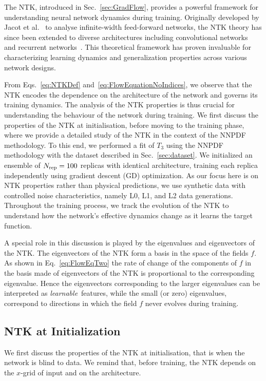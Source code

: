 The NTK, introduced in Sec.~\ref{sec:GradFlow}, provides a powerful framework for understanding neural
network dynamics during training. Originally developed by Jacot et
al.~\cite{jacot2018neural} to analyse infinite-width feed-forward networks, the
NTK theory has since been extended to diverse architectures including
convolutional networks~\cite{arora2019exact} and recurrent
networks~\cite{alemohammad2021recurrent}. This theoretical framework has proven
invaluable for characterizing learning dynamics and generalization properties
across various network designs.

From Eqs.~\eqref{eq:NTKDef} and~\eqref{eq:FlowEquationNoIndices}, we observe that the NTK encodes the
dependence on the architecture of the network and governs its training dynamics.
The analysis of the NTK properties is thus crucial for understanding the 
behaviour of the network during training. We first discuss the properties of the NTK at
initialisation, before moving to the training phase, where we provide a detailed
study of the NTK in the context of the NNPDF methodology. To this end, we
performed a fit of $T_3$ using the NNPDF methodology with the dataset described
in Sec.~\ref{sec:dataset}. We initialized an ensemble of $N_{\rm rep} = 100$ replicas with
identical architecture, training each replica independently using gradient
descent (GD) optimization. As our focus here is on NTK properties rather than
physical predictions, we use synthetic data with controlled noise
characteristics, namely L0, L1, and L2 data generations. Throughout the training process, 
we track the evolution of the NTK to understand how the network's effective
dynamics change as it learns the target function.

A special role in this discussion is played by the eigenvalues and eigenvectors of the NTK. 
The eigenvectors of the NTK form a basis in the space of the fields $f$. 
As shown in Eq.~\eqref{eq:FlowEqTwo} the rate of change of the components of $f$ in the basis 
made of eigenvectors of the NTK is proportional to the corresponding eigenvalue. Hence the 
eigenvectors corresponding to the larger eigenvalues can be interpreted as {\em learnable}\ 
features, while the small (or zero) eigenvalues, correspond to directions in which the field $f$ 
never evolves during training. 

\subsection{NTK at Initialization}
\label{sec:NTKAtInit}
We first discuss the properties of the NTK at initialisation, that is when the
network is blind to data. We remind that, before training, the NTK depends on the
$x$-grid of input and on the architecture. 

